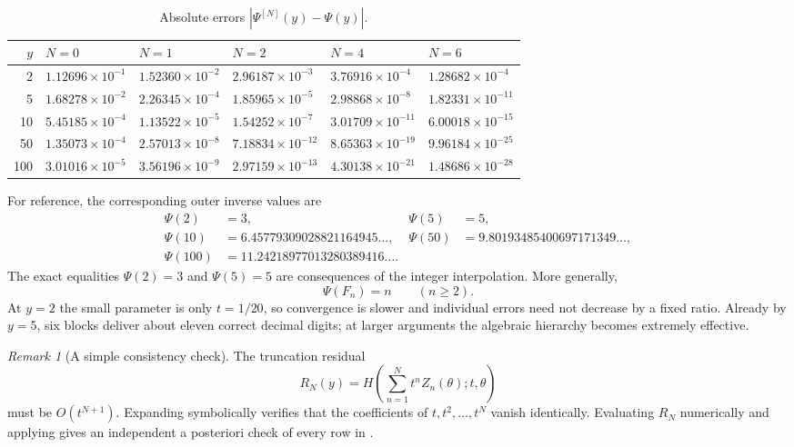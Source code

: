 \documentclass[11pt,oneside]{article}
\theoremstyle{plain}
\theoremstyle{definition}
\theoremstyle{remark}
\newtheorem{remark}[theorem]{Remark}
\newcommand{\abs}[1]{\left\lvert#1\right\rvert}
\begin{document}
\begin{table}[htbp]
\centering
\small
\caption{Absolute errors \(\abs{\Psi^{[N]}(y)-\Psi(y)}\).}
\label{tab:numerical-errors}
\begin{tabular}{@{}rlllll@{}}
\toprule
\(y\) & \(N=0\) & \(N=1\) & \(N=2\) & \(N=4\) & \(N=6\) \\
\midrule
2   & \(1.12696\times10^{-1}\) & \(1.52360\times10^{-2}\) & \(2.96187\times10^{-3}\) & \(3.76916\times10^{-4}\) & \(1.28682\times10^{-4}\) \\
5   & \(1.68278\times10^{-2}\) & \(2.26345\times10^{-4}\) & \(1.85965\times10^{-5}\) & \(2.98868\times10^{-8}\) & \(1.82331\times10^{-11}\) \\
10  & \(5.45185\times10^{-4}\) & \(1.13522\times10^{-5}\) & \(1.54252\times10^{-7}\) & \(3.01709\times10^{-11}\) & \(6.00018\times10^{-15}\) \\
50  & \(1.35073\times10^{-4}\) & \(2.57013\times10^{-8}\) & \(7.18834\times10^{-12}\) & \(8.65363\times10^{-19}\) & \(9.96184\times10^{-25}\) \\
100 & \(3.01016\times10^{-5}\) & \(3.56196\times10^{-9}\) & \(2.97159\times10^{-13}\) & \(4.30138\times10^{-21}\) & \(1.48686\times10^{-28}\) \\
\bottomrule
\end{tabular}
\end{table}

For reference, the corresponding outer inverse values are
\begin{align*}
 \Psi(2)&=3, & \Psi(5)&=5,\\
 \Psi(10)&=6.45779309028821164945\ldots, &
 \Psi(50)&=9.80193485400697171349\ldots,\\
 \Psi(100)&=11.24218977013280389416\ldots.
\end{align*}
The exact equalities \(\Psi(2)=3\) and \(\Psi(5)=5\) are consequences of the
integer interpolation.  More generally,
\begin{equation}
 \boxed{\Psi(F_n)=n\qquad(n\ge2).}
 \label{eq:inverse-Fibonacci-lattice}
\end{equation}
At \(y=2\) the small parameter is only \(t=1/20\), so convergence is slower
and individual errors need not decrease by a fixed ratio.  Already by
\(y=5\), six blocks deliver about eleven correct decimal digits; at larger
arguments the algebraic hierarchy becomes extremely effective.

\begin{remark}[A simple consistency check]
The truncation residual
\[
 R_N(y)=H\!\left(\sum_{n=1}^Nt^nZ_n(\theta);t,\theta\right)
\]
must be \(O(t^{N+1})\).  Expanding symbolically verifies that the coefficients
of \(t,t^2,\ldots,t^N\) vanish identically.  Evaluating \(R_N\) numerically and
applying  gives an independent a posteriori
check of every row in .
\end{remark}
\end{document}
